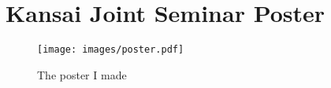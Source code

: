 \appendix
\section{Kansai Joint Seminar Poster}
\label{appendix1}

\begin{figure}[H]
\begin{center}
\texttt{[image: images/poster.pdf]}
\caption{The poster I made}
\label{diag_api_chords}
\end{center}
\end{figure}